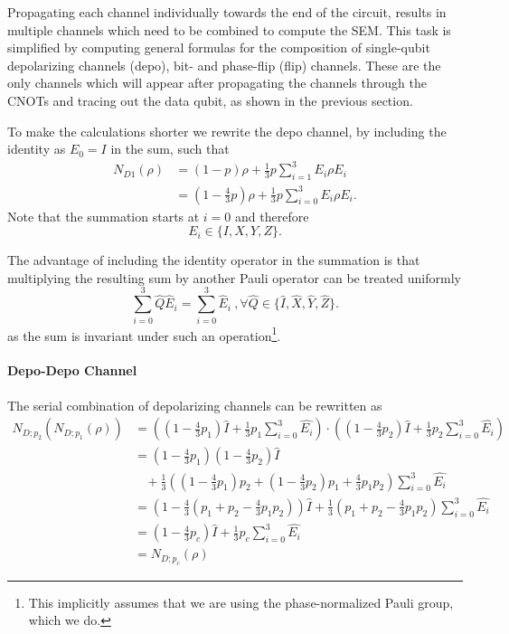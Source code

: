 Propagating each channel individually towards the end of the circuit, results in multiple channels which need to be combined to compute the SEM.
This task is simplified by computing general formulas for the composition of single-qubit depolarizing channels (depo), bit- and phase-flip (flip) channels.
These are the only channels which will appear after propagating the channels through the CNOTs and tracing out the data qubit, as shown in the previous section.

To make the calculations shorter we rewrite the depo channel, 
by including the identity as $E_0=I$ in the sum, such that 
\begin{align*}
    N_{D1}(\rho)    &= (1-p) \rho  + \frac{1}{3} p \sum_{i=1}^3 E_i \rho E_i \\
                    &= (1-\frac{4}{3}p)\rho + \frac{1}{3} p \sum_{i=0}^{3} E_i \rho E_i.
\end{align*}
Note that the summation starts at $i=0$ and therefore 
\begin{equation*}
    E_i \in \{ I, X, Y, Z\}. 
\end{equation*}

The advantage of including the identity operator in the summation is that multiplying the resulting sum by another Pauli operator can be treated uniformly
\begin{equation}
    \sum_{i=0}^{3} \hat{Q} \hat{E}_i = \sum_{i=0}^{3} \hat{E}_i\ , \forall \hat{Q} \in \{ \hat{I}, \hat{X}, \hat{Y}, \hat{Z}\}. 
    \label{eq:sum_trick}
\end{equation}
as the sum is invariant under such an operation\footnote{
    This implicitly assumes that we are using the phase-normalized Pauli group, which we do.
}.


\paragraph*{Depo-Depo Channel}

The serial combination of depolarizing channels can be rewritten as 
\begin{align*}
    N_{D;p_2}(N_{D;p_1}(\rho)) &= \left( \left(1-\frac{4}{3}p_1\right) \hat{I} + \frac{1}{3} p_1 \sum_{i=0}^{3}\hat{E_i} \right)
    \cdot \left( \left(1-\frac{4}{3}p_2\right) \hat{I} + \frac{1}{3} p_2 \sum_{i=0}^{3}\hat{E_i} \right) \\
    &= \left(1-\frac{4}{3}p_1\right)\left(1-\frac{4}{3}p_2\right) \hat{I} \\
    &  \ \ \ \ + \frac{1}{3}\left((1-\frac{4}{3}p_1)p_2 + (1-\frac{4}{3}p_2)p_1 + \frac{4}{3}p_1 p_2\right) \sum_{i=0}^{3} \hat{E_i} \\
    &= \left( 1- \frac{4}{3}\left( p_1 + p_2 - \frac{4}{3}p_1 p_2\right) \right) \hat{I} 
    + \frac{1}{3} \left( p_1 + p_2 - \frac{4}{3}p_1 p_2\right) \sum_{i=0}^{3} \hat{E_i} \\
    &= (1-\frac{4}{3}p_c)\hat{I} + \frac{1}{3} p_c \sum_{i=0}^{3} \hat{E_i}\\
    &= N_{D;p_c}(\rho)
\end{align*}

